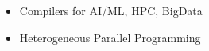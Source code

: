 

%
%

\vspace{1mm}
\begin{itemize}
\item Compilers for AI/ML, HPC, BigData
\item Heterogeneous Parallel Programming
\end{itemize}


